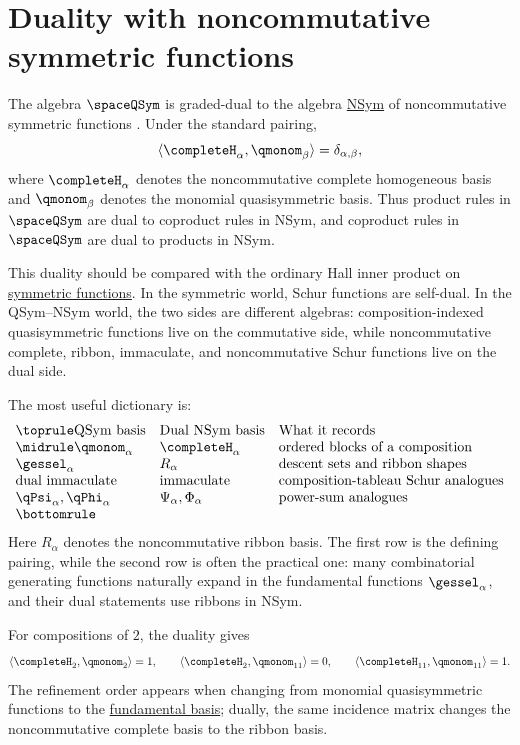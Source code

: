 \section[qsymNSymDuality]{Duality with noncommutative symmetric functions}

The algebra $\spaceQSym$ is graded-dual to the algebra
\hyperref[nonComFunctions]{NSym} of noncommutative symmetric functions
\cite{GelfandKrobLascouxLeclercRetakhThibon1995}.
Under the standard pairing,
\[
 \langle \completeH_\alpha,\qmonom_\beta\rangle=\delta_{\alpha,\beta},
\]
where $\completeH_\alpha$ denotes the noncommutative complete homogeneous
basis and $\qmonom_\beta$ denotes the monomial quasisymmetric basis.
Thus product rules in $\spaceQSym$ are dual to coproduct rules in NSym, and
coproduct rules in $\spaceQSym$ are dual to products in NSym.

This duality should be compared with the ordinary Hall inner product on
\hyperref[symmetricFunctionsSpace]{symmetric functions}.  In the symmetric
world, Schur functions are self-dual.  In the QSym--NSym world, the two sides
are different algebras: composition-indexed quasisymmetric functions live on
the commutative side, while noncommutative complete, ribbon, immaculate, and
noncommutative Schur functions live on the dual side.

The most useful dictionary is:
\[
\begin{array}{lll}
\toprule
\text{QSym basis} & \text{Dual NSym basis} & \text{What it records}\\
\midrule
\qmonom_\alpha & \completeH_\alpha
  & \text{ordered blocks of a composition}\\
\gessel_\alpha & R_\alpha
  & \text{descent sets and ribbon shapes}\\
\text{dual immaculate} & \text{immaculate}
  & \text{composition-tableau Schur analogues}\\
\qPsi_\alpha,\qPhi_\alpha & \Psi_\alpha,\Phi_\alpha
  & \text{power-sum analogues}\\
\bottomrule
\end{array}
\]
Here \(R_\alpha\) denotes the noncommutative ribbon basis.  The first row is
the defining pairing, while the second row is often the practical one: many
combinatorial generating functions naturally expand in the fundamental
functions \(\gessel_\alpha\), and their dual statements use ribbons in NSym.

\begin{example}
For compositions of $2$, the duality gives
\[
 \langle \completeH_{2},\qmonom_{2}\rangle=1,\qquad
 \langle \completeH_{2},\qmonom_{11}\rangle=0,\qquad
 \langle \completeH_{11},\qmonom_{11}\rangle=1.
\]
The refinement order appears when changing from monomial quasisymmetric
functions to the \hyperref[gessel]{fundamental basis}; dually, the same
incidence matrix changes the noncommutative complete basis to the ribbon
basis.
\end{example}

